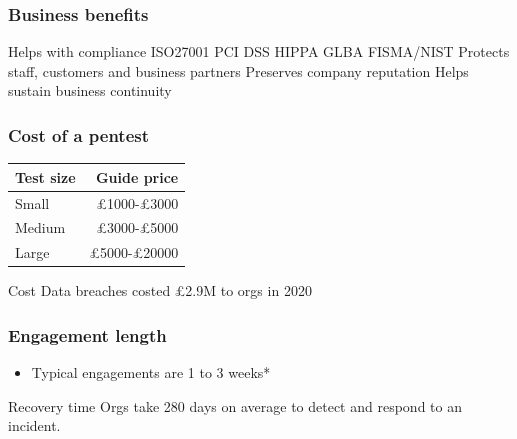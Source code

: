 \begin{frame}
    \frametitle{Business benefits}
    
    \note[item]{
    }
    
    	\begin{outline}
    		\1 Helps with compliance
    			\2 ISO27001
    			\2 PCI DSS
    			\2 HIPPA
    			\2 GLBA
    			\2 FISMA/NIST
    		\1 Protects staff, customers and business partners
    		\1 Preserves company reputation
    		\1 Helps sustain business continuity
    	\end{outline}
\end{frame}

\begin{frame}
    \frametitle{Cost of a pentest}
    
    \note[item]{
    }
    
    \begin{table}
    \begin{tabular}{l | r}
    Test size & Guide price\footnotemark\\
    \hline
    Small & £1000-£3000\\
    Medium & £3000-£5000\\
    Large & £5000-£20000\\        
    \end{tabular}
    \end{table}
	\pause
    	\begin{alertblock}{Cost}
    		Data breaches costed £2.9M to orgs in 2020
    	\end{alertblock}
    
\end{frame}

\begin{frame}
    \frametitle{Engagement length}
    
    \note[item]{
    }
    
    	\begin{itemize}
    		\item Typical engagements are 1 to 3 weeks*
    	\end{itemize}
  	\pause
    	\begin{alertblock}{Recovery time}
    		Orgs take 280 days on average to detect and respond to an incident.\footnotemark[1]
    	\end{alertblock}
    	
\end{frame}

